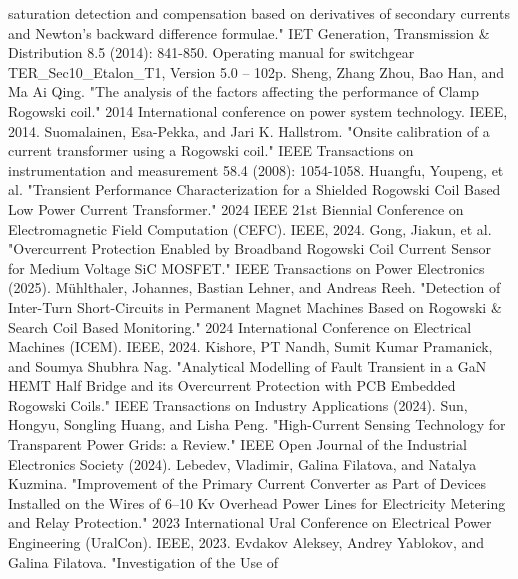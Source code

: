 saturation detection and compensation based on derivatives of secondary currents and
Newton's backward difference formulae." IET Generation, Transmission \& Distribution 8.5
(2014): 841-850.
Operating manual for switchgear TER\_Sec10\_Etalon\_T1, Version 5.0 – 102p.
Sheng, Zhang Zhou, Bao Han, and Ma Ai Qing. "The analysis of the factors affecting the
performance of Clamp Rogowski coil." 2014 International conference on power system
technology. IEEE, 2014.
Suomalainen, Esa-Pekka, and Jari K. Hallstrom. "Onsite calibration of a current
transformer using a Rogowski coil." IEEE Transactions on instrumentation and measurement
58.4 (2008): 1054-1058.
Huangfu, Youpeng, et al. "Transient Performance Characterization for a Shielded Rogowski
Coil Based Low Power Current Transformer." 2024 IEEE 21st Biennial Conference on
Electromagnetic Field Computation (CEFC). IEEE, 2024.
Gong, Jiakun, et al. "Overcurrent Protection Enabled by Broadband Rogowski Coil Current
Sensor for Medium Voltage SiC MOSFET." IEEE Transactions on Power Electronics (2025).
Mühlthaler, Johannes, Bastian Lehner, and Andreas Reeh. "Detection of Inter-Turn
Short-Circuits in Permanent Magnet Machines Based on Rogowski \& Search Coil Based
Monitoring." 2024 International Conference on Electrical Machines (ICEM). IEEE, 2024.
Kishore, PT Nandh, Sumit Kumar Pramanick, and Soumya Shubhra Nag. "Analytical Modelling of
Fault Transient in a GaN HEMT Half Bridge and its Overcurrent Protection with PCB Embedded
Rogowski Coils." IEEE Transactions on Industry Applications (2024).
Sun, Hongyu, Songling Huang, and Lisha Peng. "High-Current Sensing Technology for
Transparent Power Grids: a Review." IEEE Open Journal of the Industrial Electronics
Society (2024).
Lebedev, Vladimir, Galina Filatova, and Natalya Kuzmina. "Improvement of the Primary
Current Converter as Part of Devices Installed on the Wires of 6–10 Kv Overhead Power
Lines for Electricity Metering and Relay Protection." 2023 International Ural Conference
on Electrical Power Engineering (UralCon). IEEE, 2023.
Evdakov Aleksey, Andrey Yablokov, and Galina Filatova. "Investigation of the Use of
